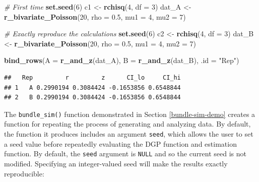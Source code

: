 \documentclass[
]{book}
\newenvironment{Shaded}{\begin{snugshade}}{\end{snugshade}}
\newcommand{\AttributeTok}[1]{\textcolor[rgb]{0.13,0.29,0.53}{#1}}
\newcommand{\CommentTok}[1]{\textcolor[rgb]{0.56,0.35,0.01}{\textit{#1}}}
\newcommand{\DecValTok}[1]{\textcolor[rgb]{0.00,0.00,0.81}{#1}}
\newcommand{\FloatTok}[1]{\textcolor[rgb]{0.00,0.00,0.81}{#1}}
\newcommand{\FunctionTok}[1]{\textcolor[rgb]{0.13,0.29,0.53}{\textbf{#1}}}
\newcommand{\NormalTok}[1]{#1}
\newcommand{\OtherTok}[1]{\textcolor[rgb]{0.56,0.35,0.01}{#1}}
\newcommand{\StringTok}[1]{\textcolor[rgb]{0.31,0.60,0.02}{#1}}
\begin{document}
\begin{Shaded}
\begin{Highlighting}[]
\CommentTok{\# First time}
\FunctionTok{set.seed}\NormalTok{(}\DecValTok{6}\NormalTok{)}
\NormalTok{c1 }\OtherTok{\textless{}{-}} \FunctionTok{rchisq}\NormalTok{(}\DecValTok{4}\NormalTok{, }\AttributeTok{df =} \DecValTok{3}\NormalTok{)}
\NormalTok{dat\_A }\OtherTok{\textless{}{-}} \FunctionTok{r\_bivariate\_Poisson}\NormalTok{(}\DecValTok{20}\NormalTok{, }\AttributeTok{rho =} \FloatTok{0.5}\NormalTok{, }\AttributeTok{mu1 =} \DecValTok{4}\NormalTok{, }\AttributeTok{mu2 =} \DecValTok{7}\NormalTok{)}

\CommentTok{\# Exactly reproduce the calculations}
\FunctionTok{set.seed}\NormalTok{(}\DecValTok{6}\NormalTok{)}
\NormalTok{c2 }\OtherTok{\textless{}{-}} \FunctionTok{rchisq}\NormalTok{(}\DecValTok{4}\NormalTok{, }\AttributeTok{df =} \DecValTok{3}\NormalTok{)}
\NormalTok{dat\_B }\OtherTok{\textless{}{-}} \FunctionTok{r\_bivariate\_Poisson}\NormalTok{(}\DecValTok{20}\NormalTok{, }\AttributeTok{rho =} \FloatTok{0.5}\NormalTok{, }\AttributeTok{mu1 =} \DecValTok{4}\NormalTok{, }\AttributeTok{mu2 =} \DecValTok{7}\NormalTok{)}

\FunctionTok{bind\_rows}\NormalTok{(}\AttributeTok{A =} \FunctionTok{r\_and\_z}\NormalTok{(dat\_A), }\AttributeTok{B =} \FunctionTok{r\_and\_z}\NormalTok{(dat\_B), }\AttributeTok{.id =} \StringTok{"Rep"}\NormalTok{)}
\end{Highlighting}
\end{Shaded}

\begin{verbatim}
##   Rep         r         z      CI_lo     CI_hi
## 1   A 0.2990194 0.3084424 -0.1653856 0.6548844
## 2   B 0.2990194 0.3084424 -0.1653856 0.6548844
\end{verbatim}

The \texttt{bundle\_sim()} function demonstrated in Section \ref{bundle-sim-demo} creates a function for repeating the process of generating and analyzing data.
By default, the function it produces includes an argument \texttt{seed}, which allows the user to set a seed value before repeatedly evaluating the DGP function and estimation function.
By default, the \texttt{seed} argument is \texttt{NULL} and so the current seed is not modified.
Specifying an integer-valued seed will make the results exactly reproducible:
\end{document}
